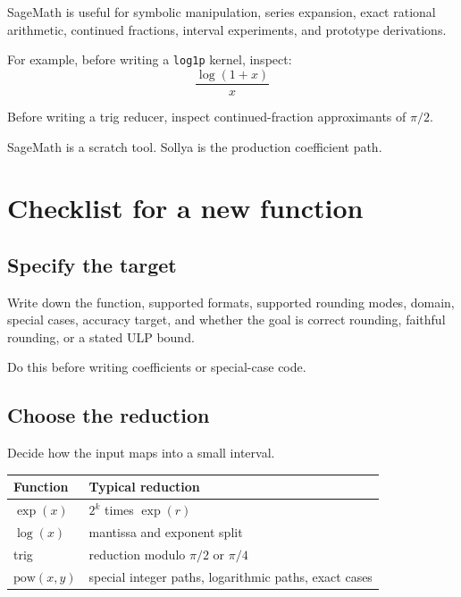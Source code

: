\documentclass[manuscript, nonacm]{acmart}
\begin{document}
    SageMath is useful for symbolic manipulation, series expansion, exact rational
    arithmetic, continued fractions, interval experiments, and prototype
    derivations.

    For example, before writing a \texttt{log1p} kernel, inspect:
    \[ \frac{\log(1+x)}{x} \]

    Before writing a trig reducer, inspect continued-fraction approximants of
    $\pi/2$.

    SageMath is a scratch tool. Sollya is the production coefficient path.



    \section{Checklist for a new function}

    \subsection{Specify the target}

    Write down the function, supported formats, supported rounding modes, domain,
    special cases, accuracy target, and whether the goal is correct rounding,
    faithful rounding, or a stated ULP bound.

    Do this before writing coefficients or special-case code.

    \subsection{Choose the reduction}

    Decide how the input maps into a small interval.

    \begin{table}[tbp]
        \centering
        \begin{tabular}{ll}
            \toprule
            Function            & Typical reduction                                     \\
            \midrule
            $\exp(x)$           & $2^k$ times $\exp(r)$                                 \\
            $\log(x)$           & mantissa and exponent split                           \\
            trig                & reduction modulo $\pi/2$ or $\pi/4$                   \\
            $\mathrm{pow}(x,y)$ & special integer paths, logarithmic paths, exact cases \\
            \bottomrule
        \end{tabular}
    \end{table}
\end{document}
